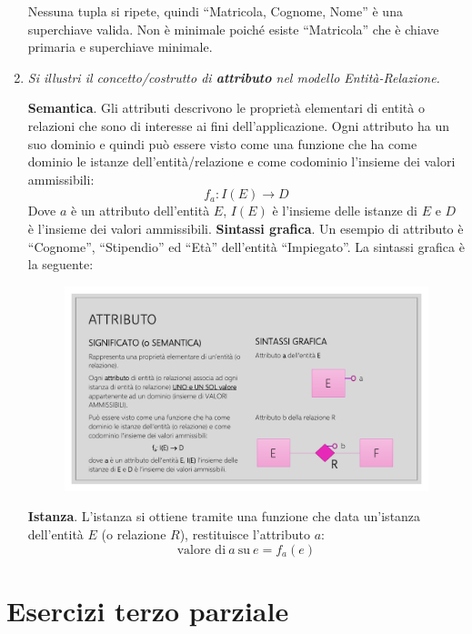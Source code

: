 \documentclass[a4paper]{article}
\newcommand{\dquotes}[1]{``#1''}
\begin{document}
\begin{enumerate}
		\noindent
		Nessuna tupla si ripete, quindi \dquotes{Matricola, Cognome, Nome} è una superchiave valida. Non è minimale poiché esiste \dquotes{Matricola} che è chiave primaria e superchiave minimale.
		\newpage
		
		
		\item \textcolor{Green4}{\emph{Si illustri il concetto/costrutto di \textbf{attributo} nel modello Entità-Relazione.}}
		
		\textbf{Semantica}. Gli attributi descrivono le proprietà elementari di entità o relazioni che sono di interesse ai fini dell'applicazione. Ogni attributo ha un suo dominio e quindi può essere visto come una funzione che ha come dominio le istanze dell'entità/relazione e come codominio l'insieme dei valori ammissibili:
		\begin{equation*}
			f_{a} : I\left(E\right) \rightarrow D
		\end{equation*}
		Dove $a$ è un attributo dell'entità $E$, $I\left(E\right)$ è l'insieme delle istanze di $E$ e $D$ è l'insieme dei valori ammissibili.\newline
		\textbf{Sintassi grafica}. Un esempio di attributo è \dquotes{Cognome}, \dquotes{Stipendio} ed \dquotes{Età} dell'entità \dquotes{Impiegato}. La sintassi grafica è la seguente:
		\begin{figure}[!htp]
			\centering
			\includegraphics[width=.5\textwidth]{img/attributo_def.pdf}
		\end{figure}
		
		\noindent
		\textbf{Istanza}. L'istanza si ottiene tramite una funzione che data un'istanza dell'entità $E$ (o relazione $R$), restituisce l'attributo $a$:
		\begin{equation*}
			\text{valore di} \: a \: \text{su} \: e = f_{a}\left(e\right)
		\end{equation*}
	\end{enumerate}\newpage
	
	\section{Esercizi terzo parziale}
	
\end{document}

